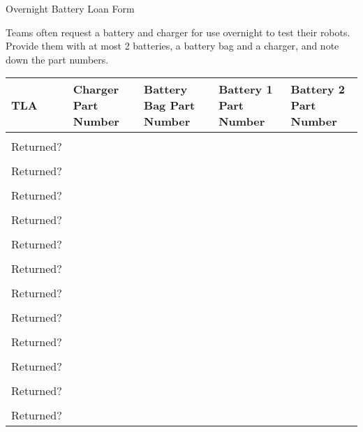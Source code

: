 \documentclass[a4paper, 12pt]{article}
\begin{document}
\begin{center}

    {\huge{Overnight Battery Loan Form}}

\end{center}

Teams often request a battery and charger for use overnight to test their robots. Provide them with at most 2 batteries, a battery bag and a charger, and note down the part numbers.

\begin{center}
\begin{table}[h]
\def\arraystretch{1.5}
\begin{tabularx}{\textwidth}{|Y|Y|Y|Y|Y|}
    \textbf{TLA} &
    \textbf{Charger Part Number} &
    \textbf{Battery Bag Part Number} &
    \textbf{Battery 1 Part Number} &
    \textbf{Battery 2 Part Number} \\
\hline
\large
& & & & \\  \hline {}
Returned? & & & & \\ \hline
& & & & \\  \hline {}
Returned? & & & & \\ \hline
& & & & \\  \hline {}
Returned? & & & & \\ \hline
& & & & \\  \hline {}
Returned? & & & & \\ \hline
& & & & \\  \hline {}
Returned? & & & & \\ \hline
& & & & \\  \hline {}
Returned? & & & & \\ \hline
& & & & \\  \hline {}
Returned? & & & & \\ \hline
& & & & \\  \hline {}
Returned? & & & & \\ \hline
& & & & \\  \hline {}
Returned? & & & & \\ \hline
& & & & \\  \hline {}
Returned? & & & & \\ \hline
& & & & \\  \hline {}
Returned? & & & & \\ \hline
& & & & \\  \hline {}
Returned? & & & & \\ \hline
\end{tabularx}
\end{table}
\end{center}
\end{document}
